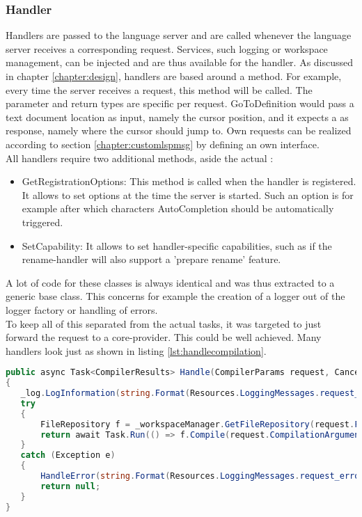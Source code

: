 \subsubsection{Handler}
Handlers are passed to the language server and are called whenever the language server receives a corresponding request.
Services, such logging or workspace management, can be injected and are thus available for the handler.
As discussed in chapter \ref{chapter:design}, handlers are based around a  method.
For example, every time the server receives a  request, this  method will be called.
The parameter and return types are specific per request.
GoToDefinition would pass a text document location as input, namely the cursor position, and it expects a  as response,
namely where the cursor should jump to.
Own requests can be realized according to section \ref{chapter:customlspmsg} by defining an own interface.\\

All handlers require two additional methods, aside the actual :
\begin{itemize}
    \item GetRegistrationOptions: This method is called when the handler is registered.
    It allows to set options at the time the server is started.
    Such an option is for example after which characters AutoCompletion should be automatically triggered.
    \item SetCapability: It allows to set handler-specific capabilities, such as if the rename-handler will also support a 'prepare rename' feature.
\end{itemize}

A lot of code for these classes is always identical and was thus extracted to a generic base class.
This concerns for example the creation of a logger out of the logger factory or handling of errors.\\

To keep all of this separated from the actual tasks, it was targeted to just forward the request to a core-provider.
This could be well achieved.
Many handlers look just as shown in listing \ref{lst:handlecompilation}.

\begin{lstlisting}[language=csharp, caption={Handling Compilation}, captionpos=b, label={lst:handlecompilation}]
public async Task<CompilerResults> Handle(CompilerParams request, CancellationToken cancellationToken)
{
   _log.LogInformation(string.Format(Resources.LoggingMessages.request_handle, _method));
   try
   {
       FileRepository f = _workspaceManager.GetFileRepository(request.FileToCompile);
       return await Task.Run(() => f.Compile(request.CompilationArguments), cancellationToken);
   }
   catch (Exception e)
   {
       HandleError(string.Format(Resources.LoggingMessages.request_error, _method), e);
       return null;
   }
}
\end{lstlisting}

